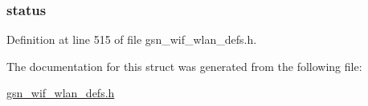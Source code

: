 \hypertarget{a00316_ac4f6d5d1544a8d2c1309479ffe1b61ab}{
\subsubsection[{status}]{ {\bf status}}}
\label{a00316_ac4f6d5d1544a8d2c1309479ffe1b61ab}


Definition at line 515 of file gsn\_\-wif\_\-wlan\_\-defs.h.



The documentation for this struct was generated from the following file:\begin{DoxyCompactItemize}
\item 
\hyperlink{a00613}{gsn\_\-wif\_\-wlan\_\-defs.h}\end{DoxyCompactItemize}
